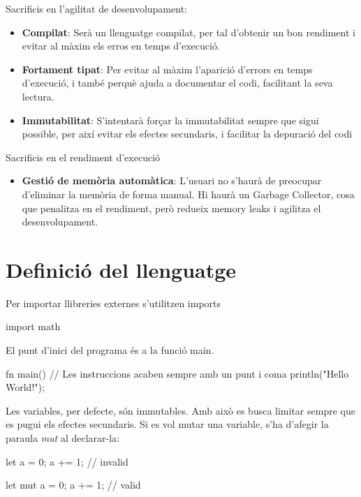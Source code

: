 ﻿\documentclass{article}
\begin{document}
Sacrificis en l'agilitat de desenvolupament:
\begin{itemize}
    \item \textbf{Compilat}: Serà un llenguatge compilat, per tal d'obtenir un
        bon rendiment i evitar al màxim els erros en temps d'execució.
    \item \textbf{Fortament tipat}: Per evitar al màxim l'aparició d'errors en
        temps d'execució, i també perquè ajuda a documentar el codi, facilitant
        la seva lectura.
    \item \textbf{Immutabilitat}: S'intentarà forçar la immutabilitat sempre que
        sigui possible, per així evitar els efectes secundaris, i facilitar la depuració
        del codi
\end{itemize}

Sacrificis en el rendiment d'execució
\begin{itemize}
    \item \textbf{Gestió de memòria automàtica}: L'usuari no s'haurà de preocupar
        d'eliminar la memòria de forma manual. Hi haurà un Garbage Collector,
        cosa que penalitza en el rendiment, però redueix memory leaks i agilitza
        el desenvolupament.
\end{itemize}

\section{Definició del llenguatge}

Per importar llibreries externes s'utilitzen imports

\begin{code}
import math
\end{code}

El punt d'inici del programa és a la funció main.

\begin{code}
fn main() {
    // Les instruccions acaben sempre amb un punt i coma
    println("Hello World!");
}
\end{code}

Les variables, per defecte, són immutables. Amb això es busca limitar sempre
que es pugui els efectes secundaris. Si es vol mutar una variable, s'ha d'afegir
la paraula \textit{mut} al declarar-la:

\begin{code}
let a = 0;
a += 1; // invalid

let mut a = 0;
a += 1; // valid
\end{code}
\end{document}
